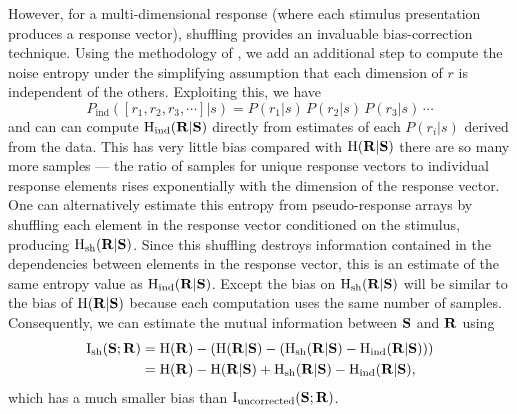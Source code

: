 However, for a multi-dimensional response (where each stimulus presentation produces a response vector), shuffling provides an invaluable bias-correction technique.
Using the methodology of \citet{Montemurro2007}, we add an additional step to compute the noise entropy under the simplifying assumption that each dimension of $r$ is independent of the others.
Exploiting this, we have
\begin{equation}
P_\text{ind}([r_1,r_2,r_3,\cdots]|s) = P(r_1|s)\,P(r_2|s)\,P(r_3|s)\,\cdots
\end{equation}
and can can compute $\operatorname{H}_\text{ind}( \mathbf{R} | \mathbf{S} )$ directly from estimates of each $P(r_i|s)$ derived from the data.
This has very little bias compared with $\operatorname{H}( \mathbf{R} | \mathbf{S} )$ there are so many more samples --- the ratio of samples for unique response vectors to individual response elements rises exponentially with the dimension of the response vector.
One can alternatively estimate this entropy from pseudo-response arrays by shuffling each element in the response vector conditioned on the stimulus, producing $\operatorname{H}_\text{sh}( \mathbf{R} | \mathbf{S} )$.
Since this shuffling destroys information contained in the dependencies between elements in the response vector, this is an estimate of the same entropy value as $\operatorname{H}_\text{ind}( \mathbf{R} | \mathbf{S} )$.
Except the bias on $\operatorname{H}_\text{sh}( \mathbf{R} | \mathbf{S} )$ will be similar to the bias of $\operatorname{H}( \mathbf{R} | \mathbf{S} )$ because each computation uses the same number of samples.
Consequently, we can estimate the mutual information between $\mathbf{S}$ and $\mathbf{R}$ using
\begin{align}
\operatorname{I}_{\text{sh}}(\mathbf{S};\mathbf{R})
   &= \operatorname{H}( \mathbf{R} ) - \left( \operatorname{H}( \mathbf{R} | \mathbf{S} ) - \left( \operatorname{H}_\text{sh}( \mathbf{R} | \mathbf{S} ) - \operatorname{H}_\text{ind}( \mathbf{R} | \mathbf{S} ) \right) \right) \notag
\\ &= \operatorname{H}( \mathbf{R} ) - \operatorname{H}( \mathbf{R} | \mathbf{S} ) + \operatorname{H}_\text{sh}( \mathbf{R} | \mathbf{S} ) - \operatorname{H}_\text{ind}( \mathbf{R} | \mathbf{S} )
,\end{align}
which has a much smaller bias than $\operatorname{I}_{\text{uncorrected}}(\mathbf{S};\mathbf{R})$.

